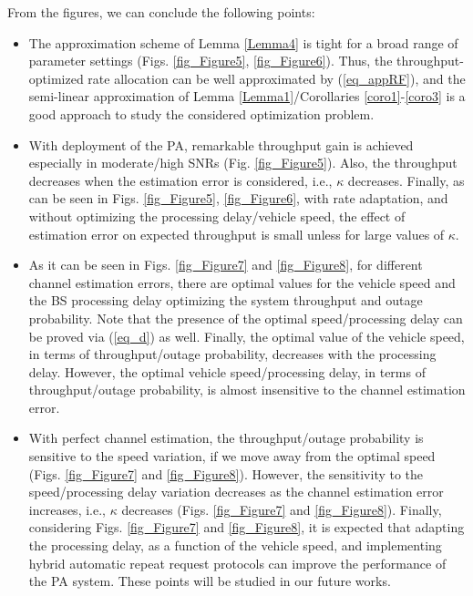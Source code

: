 From the figures, we can conclude the following points:
\begin{itemize}
    \item The approximation scheme of Lemma \ref{Lemma4} is tight for a broad range of parameter settings (Figs. \ref{fig_Figure5}, \ref{fig_Figure6}). Thus, the throughput-optimized rate allocation can be well approximated by (\ref{eq_appRF}), and the semi-linear approximation of Lemma \ref{Lemma1}/Corollaries \ref{coro1}-\ref{coro3} is a good approach to study the considered optimization problem.
    
    \item With deployment of the PA, remarkable throughput gain is achieved especially in moderate/high SNRs (Fig. \ref{fig_Figure5}). Also, the throughput decreases when the estimation error is considered, i.e., $\kappa$ decreases. Finally, as can be seen in Figs.  \ref{fig_Figure5}, \ref{fig_Figure6}, with rate adaptation,  and without optimizing the processing delay/vehicle speed, the effect of estimation error on expected throughput  is small unless for large values of $\kappa$.

    
    \item As it can be seen in Figs. \ref{fig_Figure7} and \ref{fig_Figure8}, for different channel estimation errors, there are optimal values for the vehicle speed and the BS processing delay optimizing the system throughput and outage probability. Note that the presence of the optimal speed/processing delay can be proved via (\ref{eq_d}) as well. Finally, the optimal value of the vehicle speed, in terms of throughput/outage probability, decreases with the processing delay. However, the optimal vehicle speed/processing delay, in terms of throughput/outage probability, is almost insensitive to the channel estimation error.

    \item With perfect channel estimation, the throughput/outage probability is sensitive to the speed variation, if we move away from the optimal speed (Figs. \ref{fig_Figure7} and \ref{fig_Figure8}). However, the sensitivity to the speed/processing delay variation decreases as the channel estimation error increases, i.e., $\kappa$ decreases (Figs. \ref{fig_Figure7} and \ref{fig_Figure8}). Finally, considering Figs. \ref{fig_Figure7} and \ref{fig_Figure8}, it is expected that adapting the processing delay, as a function of the vehicle speed, and implementing hybrid automatic repeat request protocols can improve the performance of the PA system. These points will be studied in our future works.

\end{itemize}





